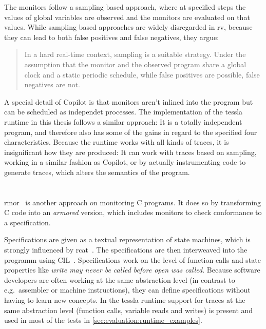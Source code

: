 The monitors follow a sampling based approach, where at specified steps the values of global variables are observed and the monitors are evaluated
on that values.
While sampling based approaches are widely disregarded in \gls{rv}, because they can lead to both false positives and false negatives,
they argue:

\begin{quote}
  In a hard real-time context, sampling is a suitable strategy.
  Under the assumption that the monitor and the observed program share a global clock and a static periodic schedule, while false positives are possible, false negatives are not.~\cite{Pike2010}
\end{quote}

A special detail of Copilot is that monitors aren't inlined into the program but can be scheduled as independet processes.
The implementation of the \gls{tessla} runtime in this thesis follows a similar approach: It is a totally independent program,
and therefore also has some of the gains in regard to the specified four characteristics.
Because the runtime works with all kinds of traces, it is insignificant how they are produced:
It can work with traces based on sampling, working in a similar fashion as Copilot, or by actually instrumenting code to generate
traces, which alters the semantics of the program.

\section{}
\label{sec:related:rmor}

\gls{rmor}~\citep{Havelund2008} is another approach on monitoring C programs.
It does so by transforming C code into an \emph{armored} version, which includes monitors to check conformance to a specification.

Specifications are given as a textual representation of state machines, which is strongly influenced by \gls{rcat}~\citep{Smith2008}.
The specifications are then interweaved into the programm using CIL~\cite{Necula2002}.
Specifications work on the level of function calls and state properties like \emph{write may never be called before open was called}.
Because software developers are often working at the same abstraction level (in contrast to e.g.\ assembler or machine instructions), they can define specifications without having to learn new concepts.
In the \gls{tessla} runtime support for traces at the same abstraction level (function calls, variable reads and writes) is present and used in most of the tests in \cref{sec:evaluation:runtime_examples}.

